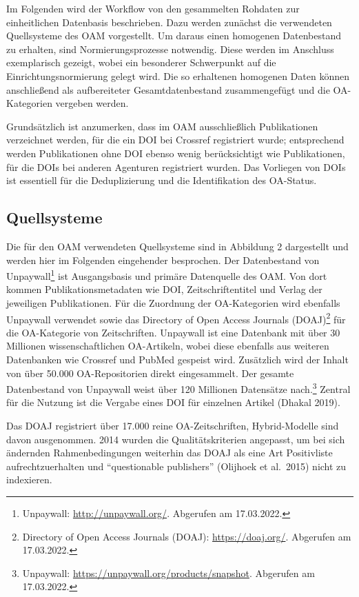 \documentclass[a4paper,
fontsize=11pt,
oneside,
numbers=noperiodatend,
parskip=half-,
bibliography=totoc,
final
]{scrartcl}
\begin{document}
Im Folgenden wird der Workflow von den gesammelten Rohdaten zur
einheitlichen Datenbasis beschrieben. Dazu werden zunächst die
verwendeten Quellsysteme des OAM vorgestellt. Um daraus einen homogenen
Datenbestand zu erhalten, sind Normierungsprozesse notwendig. Diese
werden im Anschluss exemplarisch gezeigt, wobei ein besonderer
Schwerpunkt auf die Einrichtungsnormierung gelegt wird. Die so
erhaltenen homogenen Daten können anschließend als aufbereiteter
Gesamtdatenbestand zusammengefügt und die OA-Kategorien vergeben werden.

Grundsätzlich ist anzumerken, dass im OAM ausschließlich Publikationen
verzeichnet werden, für die ein DOI bei Crossref registriert wurde;
entsprechend werden Publikationen ohne DOI ebenso wenig berücksichtigt
wie Publikationen, für die DOIs bei anderen Agenturen registriert
wurden. Das Vorliegen von DOIs ist essentiell für die Deduplizierung und
die Identifikation des OA-Status.

\hypertarget{quellsysteme}{%
\subsection{Quellsysteme}\label{quellsysteme}}

Die für den OAM verwendeten Quellsysteme sind in Abbildung 2 dargestellt
und werden hier im Folgenden eingehender besprochen. Der Datenbestand
von Unpaywall\footnote{Unpaywall: \url{http://unpaywall.org/}. Abgerufen
  am 17.03.2022.} ist Ausgangsbasis und primäre Datenquelle des OAM. Von
dort kommen Publikationsmetadaten wie DOI, Zeitschriftentitel und Verlag
der jeweiligen Publikationen. Für die Zuordnung der OA-Kategorien wird
ebenfalls Unpaywall verwendet sowie das Directory of Open Access
Journals (DOAJ)\footnote{Directory of Open Access Journals (DOAJ):
  \url{https://doaj.org/}. Abgerufen am 17.03.2022.} für die
OA-Kategorie von Zeitschriften. Unpaywall ist eine Datenbank mit über 30
Millionen wissenschaftlichen OA-Artikeln, wobei diese ebenfalls aus
weiteren Datenbanken wie Crossref und PubMed gespeist wird. Zusätzlich
wird der Inhalt von über 50.000 OA-Repositorien direkt eingesammelt. Der
gesamte Datenbestand von Unpaywall weist über 120 Millionen Datensätze
nach.\footnote{Unpaywall: \url{https://unpaywall.org/products/snapshot}.
  Abgerufen am 17.03.2022.} Zentral für die Nutzung ist die Vergabe
eines DOI für einzelnen Artikel (Dhakal 2019).

Das DOAJ registriert über 17.000 reine OA-Zeitschriften, Hybrid-Modelle
sind davon ausgenommen. 2014 wurden die Qualitätskriterien angepasst, um
bei sich ändernden Rahmenbedingungen weiterhin das DOAJ als eine Art
Positivliste aufrechtzuerhalten und \enquote{questionable publishers}
(Olijhoek et al.~2015) nicht zu indexieren.
\end{document}
